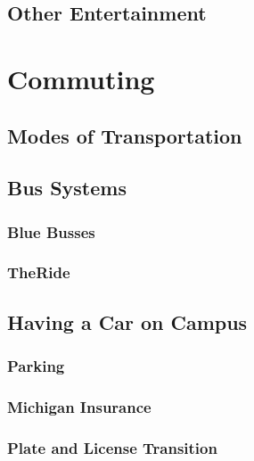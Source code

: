 \documentclass[
]{book}
\begin{document}
\hypertarget{other-entertainment}{%
\section{Other Entertainment}\label{other-entertainment}}

\hypertarget{commuting}{%
\chapter{Commuting}\label{commuting}}

\hypertarget{modes-of-transportation}{%
\section{Modes of Transportation}\label{modes-of-transportation}}

\hypertarget{bus-systems}{%
\section{Bus Systems}\label{bus-systems}}

\hypertarget{blue-busses}{%
\subsection{Blue Busses}\label{blue-busses}}

\hypertarget{theride}{%
\subsection{TheRide}\label{theride}}

\hypertarget{having-a-car-on-campus}{%
\section{Having a Car on Campus}\label{having-a-car-on-campus}}

\hypertarget{parking}{%
\subsection{Parking}\label{parking}}

\hypertarget{michigan-insurance}{%
\subsection{Michigan Insurance}\label{michigan-insurance}}

\hypertarget{plate-and-license-transition}{%
\subsection{Plate and License Transition}\label{plate-and-license-transition}}

  
\end{document}
